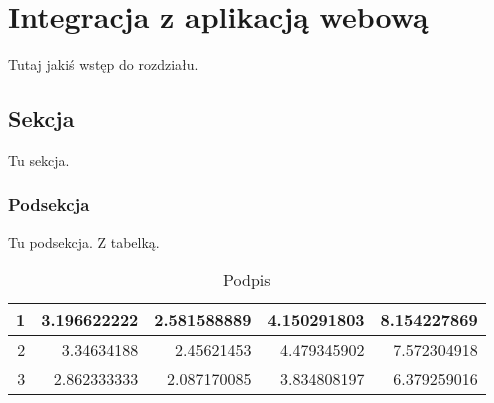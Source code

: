 \chapter{Integracja z aplikacją webową}

Tutaj jakiś wstęp do rozdziału.

\section{Sekcja}

Tu sekcja.

\subsection{Podsekcja}

Tu podsekcja. Z tabelką.
\begin{table}[H]
    \centering 
    \begin{tabular}{|r|r|r|r|r|}
        \hline
        1 & 3.196622222 & 2.581588889 & 4.150291803 & 8.154227869 \\ \hline
        2 & 3.34634188  & 2.45621453  & 4.479345902 & 7.572304918 \\ \hline
        3 & 2.862333333 & 2.087170085 & 3.834808197 & 6.379259016 \\ \hline
    \end{tabular}
    \caption{Podpis}
    \label{tab:my-table}
\end{table}


